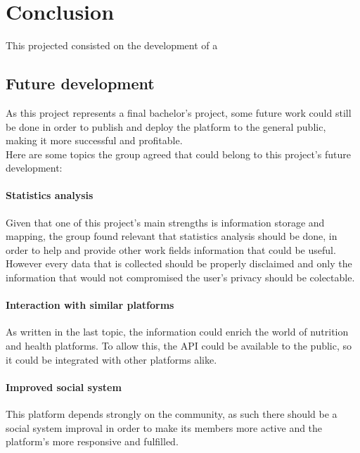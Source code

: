 \chapter{Conclusion}

This projected consisted on the development of a 

\section{Future development}

As this project represents a final bachelor's project, some future work could still be done in order
to publish and deploy the platform to the general public, making it more successful and profitable.\\

Here are some topics the group agreed that could belong to this project's future development:

\subsubsection{Statistics analysis}

Given that one of this project's main strengths is information storage and mapping, the group found
relevant that statistics analysis should be done, in order to help and provide other work fields
information that could be useful.\\

However every data that is collected should be properly disclaimed and only the information that
would not compromised the user's privacy should be colectable.

\subsubsection{Interaction with similar platforms}

As written in the last topic, the information could enrich the world of nutrition and health platforms.
To allow this, the API could be available to the public, so it could be integrated with other platforms
alike.\\

\subsubsection{Improved social system}

This platform depends strongly on the community, as such there should be a social system improval in order
to make its members more active and the platform's more responsive and fulfilled.\\


